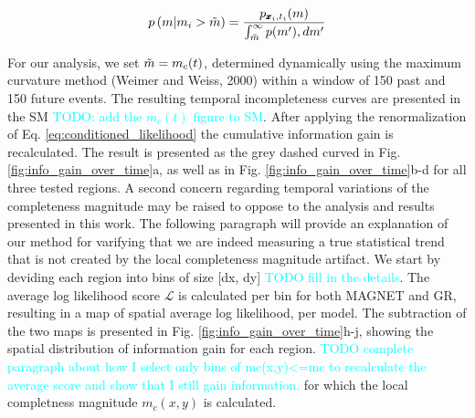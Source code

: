 \documentclass[pdflatex]{sn-jnl}
\newcommand{\neri}[1]{{\textcolor{cyan}{#1}}}
\begin{document}
\begin{equation}
    p \left( m \vert m_i > \Tilde{m} \right) = \frac{p_{\pmb{x}_i, t_i}(m)} {\int_{\Tilde{m}}^{\infty} p(m') ,dm'}
    \label{eq:conditioned_likelihood}
\end{equation}

For our analysis, we set $\Tilde{m} = m_c(t)$, determined dynamically using the maximum curvature method (Weimer and Weiss, 2000) within a window of 150 past and 150 future events. The resulting temporal incompleteness curves are presented in the SM \neri{TODO: add the $m_c(t)$ figure to SM}. After applying the renormalization of Eq. \ref{eq:conditioned_likelihood} the cumulative information gain is recalculated. The result is presented as the grey dashed curved in Fig.  \ref{fig:info_gain_over_time}a, as well as in Fig. \ref{fig:info_gain_over_time}b-d for all three tested regions.
\newline
A second concern regarding temporal variations of the completeness magnitude may be raised to oppose to the analysis and results presented in this work. The following paragraph will provide an explanation of our method for varifying that we are indeed measuring a true statistical trend that is not created by the local completeness magnitude artifact. We start by deviding each region into bins of size [dx, dy] \neri{TODO fill in the details}. The average log likelihood score $\mathcal{L}$ is calculated per bin for both MAGNET and GR, resulting in a map of spatial average log likelihood, per model. The subtraction of the two maps is presented in Fig. \ref{fig:info_gain_over_time}h-j, showing the spatial distribution of information gain for each region. 
\neri{TODO complete paragraph about how I select only bins of mc(x,y)<=mc to recalculate the average score and show that I still gain information.}
for which the local completness magnitude $m_c(x, y)$ is calculated. 





\let\oldbibliography\thebibliography
\renewcommand{\thebibliography}[1]{%
  \oldbibliography{#1}%
  \setlength{\itemsep}{10pt}%
}
% 
% 
\newpage

\end{document}
